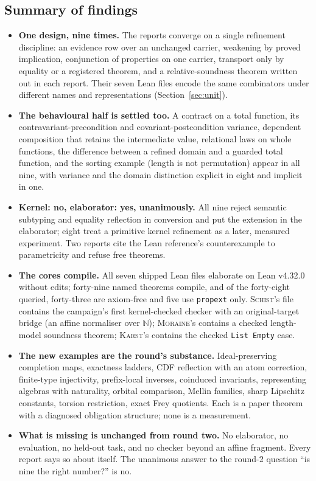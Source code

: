 \documentclass[11pt,a4paper]{article}
\newcommand{\code}[1]{\nolinkurl{#1}}
\newcommand{\Ks}{\textsc{Karst}}
\newcommand{\Mr}{\textsc{Moraine}}
\newcommand{\Sc}{\textsc{Schist}}
\newcommand{\N}{\mathbb N}
\theoremstyle{definition}
\begin{document}
\subsection{Summary of findings}
\begin{itemize}
\item \textbf{One design, nine times.} The reports converge on a single refinement discipline: an evidence row over an unchanged carrier, weakening by proved implication, conjunction of properties on one carrier, transport only by equality or a registered theorem, and a relative-soundness theorem written out in each report. Their seven Lean files encode the same combinators under different names and representations (Section~\ref{sec:unit}).
\item \textbf{The behavioural half is settled too.} A contract on a total function, its contravariant-precondition and covariant-postcondition variance, dependent composition that retains the intermediate value, relational laws on whole functions, the difference between a refined domain and a guarded total function, and the sorting example (length is not permutation) appear in all nine, with variance and the domain distinction explicit in eight and implicit in one.
\item \textbf{Kernel: no, elaborator: yes, unanimously.} All nine reject semantic subtyping and equality reflection in conversion and put the extension in the elaborator; eight treat a primitive kernel refinement as a later, measured experiment. Two reports cite the Lean reference's counterexample to parametricity and refuse free theorems.
\item \textbf{The cores compile.} All seven shipped Lean files elaborate on Lean v4.32.0 without edits; forty-nine named theorems compile, and of the forty-eight queried, forty-three are axiom-free and five use \code{propext} only. \Sc's file contains the campaign's first kernel-checked checker with an original-target bridge (an affine normaliser over $\N$); \Mr's contains a checked length-model soundness theorem; \Ks's contains the checked \code{List Empty} case.
\item \textbf{The new examples are the round's substance.} Ideal-preserving completion maps, exactness ladders, CDF reflection with an atom correction, finite-type injectivity, prefix-local inverses, coinduced invariants, representing algebras with naturality, orbital comparison, Mellin families, sharp Lipschitz constants, torsion restriction, exact Frey quotients. Each is a paper theorem with a diagnosed obligation structure; none is a measurement.
\item \textbf{What is missing is unchanged from round two.} No elaborator, no evaluation, no held-out task, and no checker beyond an affine fragment. Every report says so about itself. The unanimous answer to the round-2 question ``is nine the right number?'' is no.
\end{itemize}
\end{document}
